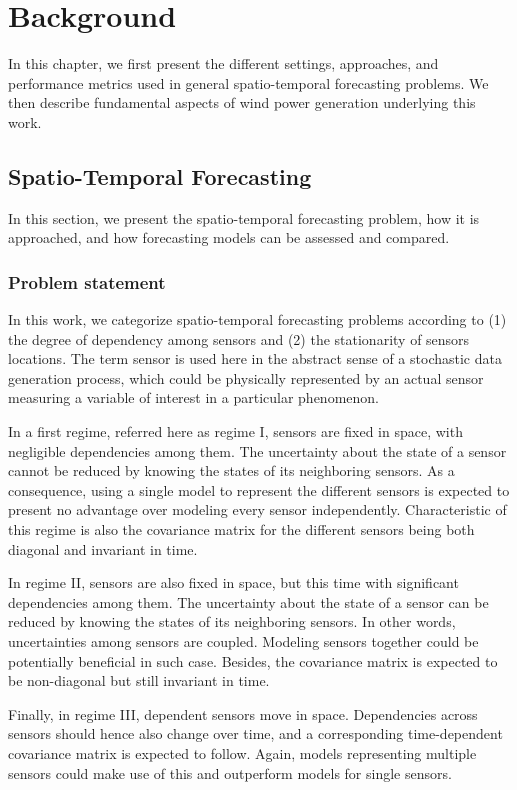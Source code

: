\chapter{Background}
In this chapter, we first present the different settings, approaches, and performance metrics used in general spatio-temporal forecasting problems.
We then describe fundamental aspects of wind power generation underlying this work.

\section{Spatio-Temporal Forecasting}
In this section, we present the spatio-temporal forecasting problem, how it is approached, and how forecasting models can be assessed and compared.

\subsection{Problem statement}
In this work, we categorize spatio-temporal forecasting problems according to (1) the degree of dependency among sensors and (2) the stationarity of sensors locations.
The term sensor is used here in the abstract sense of a stochastic data generation process, which could be physically represented by an actual sensor measuring a variable of interest in a particular phenomenon.

In a first regime, referred here as regime I, sensors are fixed in space, with negligible dependencies among them.
The uncertainty about the state of a sensor cannot be reduced by knowing the states of its neighboring sensors.
As a consequence, using a single model to represent the different sensors is expected to present no advantage over modeling every sensor independently.
Characteristic of this regime is also the covariance matrix for the different sensors being both diagonal and invariant in time. 

In regime II, sensors are also fixed in space, but this time with significant dependencies among them.
The uncertainty about the state of a sensor can be reduced by knowing the states of its neighboring sensors.
In other words, uncertainties among sensors are coupled.
Modeling sensors together could be potentially beneficial in such case. 
Besides, the covariance matrix is expected to be non-diagonal but still invariant in time. 

Finally, in regime III, dependent sensors move in space.
Dependencies across sensors should hence also change over time, and a corresponding time-dependent covariance matrix is expected to follow. 
Again, models representing multiple sensors could make use of this and outperform models for single sensors. 

